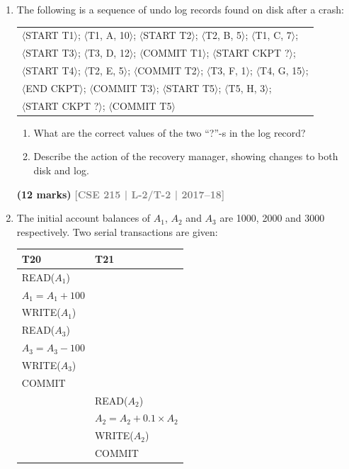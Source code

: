 \documentclass[12pt,a3paper]{article}
\newcommand{\yr}[1]{\hfill\textcolor{gray}{\small\textbf{[#1]}}}
\newcommand{\mk}[1]{\textcolor{orange!70!black}{\small\textbf{(#1 marks)}}}
\begin{document}
\begin{enumerate}
\item The following is a sequence of undo log records found on disk after a crash:
\begin{center}
\small\ttfamily
\begin{tabular}{l}
$\langle$START T1$\rangle$; $\langle$T1, A, 10$\rangle$; $\langle$START T2$\rangle$; $\langle$T2, B, 5$\rangle$; $\langle$T1, C, 7$\rangle$;\\
$\langle$START T3$\rangle$; $\langle$T3, D, 12$\rangle$; $\langle$COMMIT T1$\rangle$; $\langle$START CKPT ?\thinspace$\rangle$;\\
$\langle$START T4$\rangle$; $\langle$T2, E, 5$\rangle$; $\langle$COMMIT T2$\rangle$; $\langle$T3, F, 1$\rangle$; $\langle$T4, G, 15$\rangle$;\\
$\langle$END CKPT$\rangle$; $\langle$COMMIT T3$\rangle$; $\langle$START T5$\rangle$; $\langle$T5, H, 3$\rangle$;\\
$\langle$START CKPT ?\thinspace$\rangle$; $\langle$COMMIT T5$\rangle$
\end{tabular}
\end{center}
\begin{enumerate}
  \item What are the correct values of the two ``?''-s in the log record?
  \item Describe the action of the recovery manager, showing changes to both disk and log.
\end{enumerate}
\mk{12} \yr{CSE 215 | L-2/T-2 | 2017--18}

\item The initial account balances of $A_1$, $A_2$ and $A_3$ are 1000, 2000 and 3000 respectively. Two serial transactions are given:

\medskip
\begin{center}
\begin{tabular}{ll}
\toprule
\textbf{T20} & \textbf{T21}\\
\midrule
READ($A_1$) &\\
$A_1 = A_1 + 100$ &\\
WRITE($A_1$) &\\
READ($A_3$) &\\
$A_3 = A_3 - 100$ &\\
WRITE($A_3$) &\\
COMMIT &\\
& READ($A_2$)\\
& $A_2 = A_2 + 0.1 \times A_2$\\
& WRITE($A_2$)\\
& COMMIT\\
\bottomrule
\end{tabular}
\end{center}


\end{enumerate}
\end{document}
